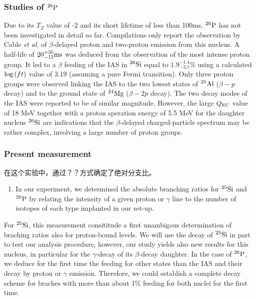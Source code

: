 \documentclass[UTF8]{ctexart}
\begin{document}
\subsubsection{Studies of $^{26}\textnormal{P}$}

Due to its $T_{Z}$ value of -2 and its short lifetime of less than 100ms, $^{26}\textnormal{P}$ has not been investigated in detail so far. Compilations only report the observation by Cable \textit{et al.} of $\beta$-delayed proton and two-proton emission from this nucleus. A half-life of $20_{-15}^{+35} \textnormal{ms}$ was deduced from the observation of the most intense proton group. It led to a $\beta$ feeding of the IAS in $^{26}\textnormal{Si}$ equal to $1.9_{-3.5}^{-1.4}\%$ using a calculated $\textnormal{log}\left( ft \right)$ value of 3.19 (assuming a pure Fermi transition). Only three proton groups were observed linking the IAS to the two lowest states of $^{25}\textnormal{Al}$ ($\beta-p$ decay) and to the ground state of $^{24}\textnormal{Mg}$ ($\beta-2p$ decay). The two decay modes of the IAS were reported to be of similar magnitude. However, the large $Q_{\textnormal{EC}}$ value of 18 MeV together with a proton speration energy of 5.5 MeV for the daughter nucleus $^{26}\textnormal{Si}$ are indications that the $\beta$-delayed charged-particle spectrum may be rather complex, involving a large number of proton groups.

\subsubsection{Present measurement}

在这个实验中，通过？？方式确定了绝对分支比。
\begin{enumerate}
    \item In our experiment, we determined the absolute branching ratios for $^{25}\textnormal{Si}$ and $^{26}\textnormal{P}$ by relating the intensity of a given proton or $\gamma$ line to the number of isotopes of each type implanted in our set-up. 
\end{enumerate}
For $^{25}\textnormal{Si}$, this measurement consititude a first unambigous determination of braching ratios also for proton-bound levels. We will use the decay of $^{25}\textnormal{Si}$ in part to test our analysis procedure, however, our study yields also new results for this nucleus, in particular for the $\gamma$-decay of its $\beta$-decay daughter. In the case of $^{26}\textnormal{P}$, we deduce for the first time the feeding for other states than the IAS and their decay by proton or $\gamma$ emission. Therefore, we could establish a complete decay scheme for braches with more than about 1\% feeding for both nuclei for the first time.
\end{document}
